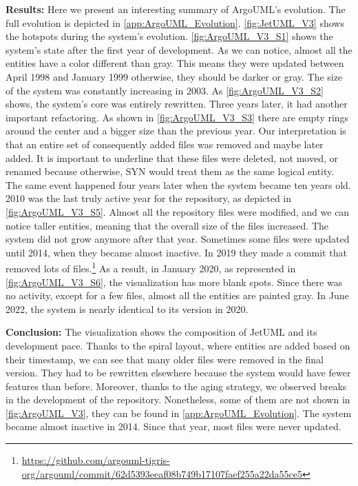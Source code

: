 \bigbreak
\noindent
\textbf{Results:}
Here we present an interesting summary of ArgoUML's evolution. The full evolution is depicted in  \autoref{app:ArgoUML_Evolution}. \autoref{fig:JetUML_V3} shows the hotspots during the system's evolution. \autoref{fig:ArgoUML_V3_S1} shows the system's state after the first year of development. As we can notice, almost all the entities have a color different than gray. This means they were updated between April 1998 and January 1999 otherwise, they should be darker or gray. The size of the system was constantly increasing in 2003. As \autoref{fig:ArgoUML_V3_S2} shows, the system's core was entirely rewritten. Three years later, it had another important refactoring. As shown in \autoref{fig:ArgoUML_V3_S3} there are empty rings around the center and a bigger size than the previous year. Our interpretation is that an entire set of consequently added files was removed and maybe later added. It is important to underline that these files were deleted, not moved, or renamed because otherwise, SYN would treat them as the same logical entity. The same event happened four years later when the system became ten years old. 2010 was the last truly active year for the repository, as depicted in \autoref{fig:ArgoUML_V3_S5}. Almost all the repository files were modified, and we can notice taller entities, meaning that the overall size of the files increased. The system did not grow anymore after that year. Sometimes some files were updated until 2014, when they became almost inactive. In 2019 they made a commit that removed lots of files.\footnote{\url{https://github.com/argouml-tigris-org/argouml/commit/62d5393eeaf08b749b17107faef255a22da55ce5}} As a result, in January 2020, as represented in \autoref{fig:ArgoUML_V3_S6}, the visualization has more blank spots. Since there was no activity, except for a few files, almost all the entities are painted gray. In June 2022, the system is nearly identical to its version in 2020. 

\bigbreak
\noindent
\textbf{Conclusion:}
The visualization shows the composition of JetUML and its development pace. Thanks to the spiral layout, where entities are added based on their timestamp, we can see that many older files were removed in the final version. They had to be rewritten elsewhere because the system would have fewer features than before. Moreover, thanks to the aging strategy, we observed breaks in the development of the repository. Nonetheless, some of them are not shown in \autoref{fig:ArgoUML_V3}, they can be found in \autoref{app:ArgoUML_Evolution}. The system became almost inactive in 2014. Since that year, most files were never updated. 



